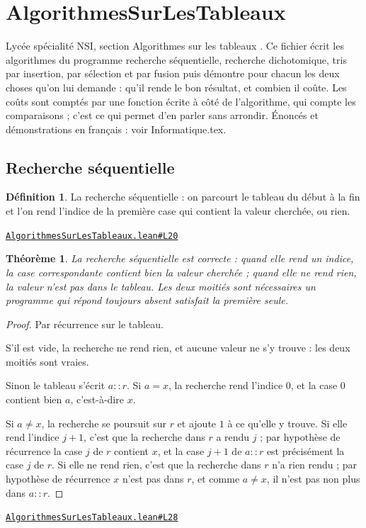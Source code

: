 \documentclass[11pt,a4paper]{article}
\theoremstyle{definition}
\newtheorem{definition}{Définition}
\theoremstyle{plain}
\newtheorem{theoreme}{Théorème}
\newcommand{\source}[2]{\par\smallskip\noindent\hfill{\footnotesize\href{#1}{\texttt{#2}}}\par\smallskip}
\begin{document}
\section{AlgorithmesSurLesTableaux}

\noindent
Lycée \textemdash{} spécialité NSI, section \og{} Algorithmes sur les tableaux \fg{}.
Ce fichier écrit les algorithmes du programme \textemdash{} recherche séquentielle, recherche
dichotomique, tris par insertion, par sélection et par fusion \textemdash{} puis démontre pour
chacun les deux choses qu'on lui demande : qu'il rende le bon résultat, et combien il
coûte. Les coûts sont comptés par une fonction écrite à côté de l'algorithme, qui
compte les comparaisons ; c'est ce qui permet d'en parler sans arrondir.
Énoncés et démonstrations en français : voir Informatique.tex.

\subsection{Recherche séquentielle}

\begin{definition}
La recherche séquentielle : on parcourt le tableau du début à la fin et l'on rend
l'indice de la première case qui contient la valeur cherchée, ou rien.
\end{definition}
\source{https://github.com/Commutator-IO/learn-lean/blob/main/courses/02-lycee/11-informatique-nsi/AlgorithmesSurLesTableaux.lean\#L20}{AlgorithmesSurLesTableaux.lean\#L20}

\begin{theoreme}
La recherche séquentielle est correcte : quand elle rend un indice, la case
correspondante contient bien la valeur cherchée ; quand elle ne rend rien, la valeur
n'est pas dans le tableau. Les deux moitiés sont nécessaires \textemdash{} un programme qui
répond toujours \og{} absent \fg{} satisfait la première seule.
\end{theoreme}
\begin{proof}
Par récurrence sur le tableau.

S'il est vide, la recherche ne rend rien, et aucune valeur ne s'y trouve : les deux
moitiés sont vraies.

Sinon le tableau s'écrit \(a :: r\). Si \(a = x\), la recherche rend l'indice \(0\), et
la case \(0\) contient bien \(a\), c'est-à-dire \(x\).

Si \(a \ne x\), la recherche se poursuit sur \(r\) et ajoute \(1\) à ce qu'elle y
trouve. Si elle rend l'indice \(j+1\), c'est que la recherche dans \(r\) a rendu \(j\) ;
par hypothèse de récurrence la case \(j\) de \(r\) contient \(x\), et la case \(j+1\) de
\(a :: r\) est précisément la case \(j\) de \(r\). Si elle ne rend rien, c'est que la
recherche dans \(r\) n'a rien rendu ; par hypothèse de récurrence \(x\) n'est pas dans
\(r\), et comme \(a \ne x\), il n'est pas non plus dans \(a :: r\).
\end{proof}
\source{https://github.com/Commutator-IO/learn-lean/blob/main/courses/02-lycee/11-informatique-nsi/AlgorithmesSurLesTableaux.lean\#L28}{AlgorithmesSurLesTableaux.lean\#L28}
\end{document}
